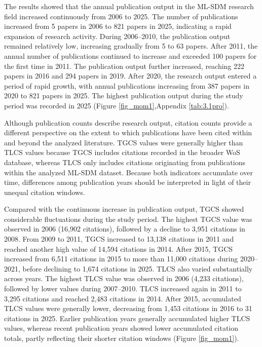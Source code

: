 \documentclass[authoryear,preprint,review,12pt]{elsarticle}
\begin{document}
The results showed that the annual publication output in the ML-SDM research field increased continuously from 2006 to 2025. The number of publications increased from 5 papers in 2006 to 821 papers in 2025, indicating a rapid expansion of research activity. During 2006–2010, the publication output remained relatively low, increasing gradually from 5 to 63 papers. After 2011, the annual number of publications continued to increase and exceeded 100 papers for the first time in 2011. The publication output further increased, reaching 222 papers in 2016 and 294 papers in 2019. After 2020, the research output entered a period of rapid growth, with annual publications increasing from 387 papers in 2020 to 821 papers in 2025. The highest publication output during the study period was recorded in 2025 (Figure \ref{fig_mom1},Appendix \ref{tab:3.1pro}).

Although publication counts describe research output, citation counts provide a different perspective on the extent to which publications have been cited within and beyond the analyzed literature. TGCS values were generally higher than TLCS values because TGCS includes citations recorded in the broader WoS database, whereas TLCS only includes citations originating from publications within the analyzed ML-SDM dataset. Because both indicators accumulate over time, differences among publication years should be interpreted in light of their unequal citation windows.

Compared with the continuous increase in publication output, TGCS showed considerable fluctuations during the study period. The highest TGCS value was observed in 2006 (16,902 citations), followed by a decline to 3,951 citations in 2008. From 2009 to 2011, TGCS increased to 13,138 citations in 2011 and reached another high value of 14,594 citations in 2014. After 2015, TGCS increased from 6,511 citations in 2015 to more than 11,000 citations during 2020–2021, before declining to 1,674 citations in 2025. TLCS also varied substantially across years. The highest TLCS value was observed in 2006 (4,233 citations), followed by lower values during 2007–2010. TLCS increased again in 2011 to 3,295 citations and reached 2,483 citations in 2014. After 2015, accumulated TLCS values were generally lower, decreasing from 1,453 citations in 2016 to 31 citations in 2025. Earlier publication years generally accumulated higher TLCS values, whereas recent publication years showed lower accumulated citation totals, partly reflecting their shorter citation windows (Figure \ref{fig_mom1}).
\end{document}
